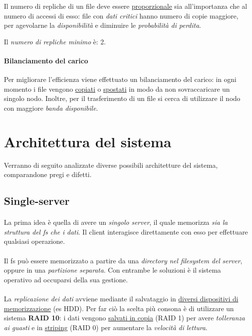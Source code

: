 \documentclass{article}
\begin{document}
Il numero di repliche di un file deve essere \underline{proporzionale} sia all'importanza che al numero di accessi di esso: file con \emph{dati critici} hanno numero di copie maggiore, per agevolarne la \emph{disponibilità} e diminuire le \emph{probabilità di perdita}. 

Il \emph{numero di repliche minimo} è: 2.

\paragraph{Bilanciamento del carico} Per migliorare l'efficienza viene effettuato un bilanciamento del carico: in ogni momento i file vengono \underline{copiati} o \underline{spostati} in modo da non sovraccaricare un singolo nodo. Inoltre, per il trasferimento di un file si cerca di utilizzare il nodo con maggiore \emph{banda disponibile}. 



\section{Architettura del sistema}

Verranno di seguito analizzate diverse possibili architetture del sistema, comparandone pregi e difetti. 

\subsection{Single-server}

\paragraph{} La prima idea è quella di avere un \emph{singolo server}, il quale memorizza \emph{sia la struttura del fs che i dati}. Il client interagisce direttamente con esso per effettuare qualsiasi operazione. 

\paragraph{} Il fs può essere memorizzato a partire da una \emph{directory nel filesystem del server}, oppure in una \emph{partizione separata}. Con entrambe le soluzioni è il sistema operativo ad occuparsi della sua gestione.

\paragraph{} La \emph{replicazione dei dati} avviene mediante il salvataggio in \underline{diversi dispositivi di memorizzazione} (es HDD). Per far ciò la scelta più consona è di utilizzare un sistema \textbf{RAID 10}: i dati vengono \underline{salvati in copia} (RAID 1) per avere \emph{tolleranza ai guasti} e in \underline{striping} (RAID 0) per aumentare la \emph{velocità di lettura}. 
\end{document}
